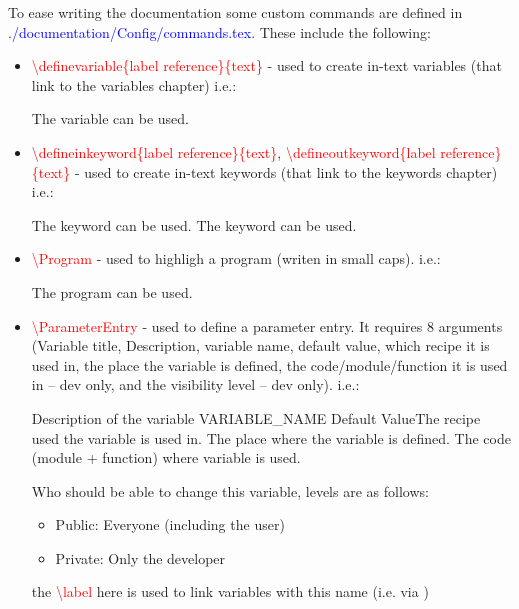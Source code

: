 To ease writing the documentation some custom commands are defined in \textcolor{blue}{./documentation/Config/commands.tex}. These include the following:
\begin{itemize}
	\label{text:definevariable}
	\item \textcolor{red}{\textbackslash{definevariable}\{label reference\}\{text\}} - used to create in-text variables (that link to the variables chapter) i.e.:
	\begin{latexbox}
	The variable  can be used.
	\end{latexbox}

	\label{text:defineinkeyword}
	\item \textcolor{red}{\textbackslash{defineinkeyword}\{label reference\}\{text\}}, \textcolor{red}{\textbackslash{defineoutkeyword}\{label reference\}\{text\}} - used to create in-text keywords (that link to the keywords chapter) i.e.:
	\begin{latexbox}
	The keyword  can be used.
	The keyword  can be used.
	\end{latexbox}

	\item \textcolor{red}{\textbackslash{Program}} - used to highligh a program (writen in small caps). i.e.:
	\begin{latexbox}
	The program  can be used.
	\end{latexbox}

	\newpage

	\item \begin{minipage}[t]{\textwidth} 
	\textcolor{red}{\textbackslash{ParameterEntry}} - used to define a parameter entry. It requires 8 arguments (Variable title, Description, variable name, default value, which recipe it is used in, the place the variable is defined, the code/module/function it is used in -- dev only, and the visibility level -- dev only). i.e.:
	\begin{latexbox}
	\label{text:variable_name1}
	\ParameterEntry{Variable title}
	{Description of the variable}
	{VARIABLE\_NAME}
	{Default Value}{The recipe used the variable is used in.}
	{The place where the variable is defined.}
	{The code (module + function) where variable is used.}
	{
	Who should be able to change this variable, levels are as follows:
	\begin{itemize}
		\item Public: Everyone (including the user)
		\item Private: Only the developer
	\end{itemize}
	}
	\end{latexbox}
	\begin{note}
	the \textcolor{red}{\textbackslash{label}} here is used to link variables with this name (i.e. via )
	\end{note}
	\end{minipage}


\end{itemize}
